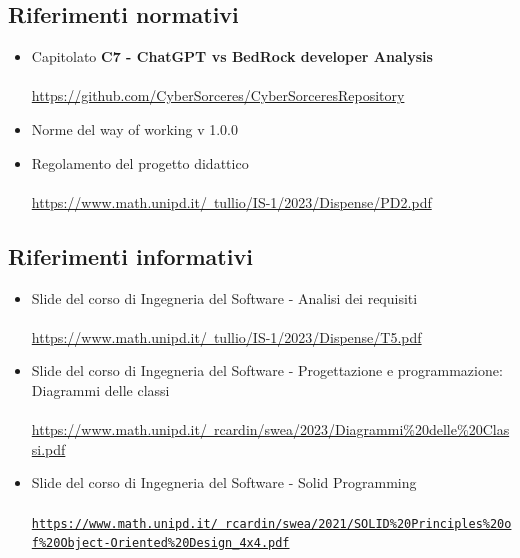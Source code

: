 \documentclass{article}
\begin{document}
{\subsection{Riferimenti normativi}
\begin{itemize}
    \item Capitolato \textbf{C7 - ChatGPT vs BedRock developer Analysis}
    \\ \\
       \href{https://github.com/CyberSorceres/CyberSorceresRepository}{https://github.com/CyberSorceres/CyberSorceresRepository} 
    \item Norme del way of working v 1.0.0
    \item Regolamento del progetto didattico \\ \\ \href{https://www.math.unipd.it/~tullio/IS-1/2023/Dispense/PD2.pdf} 
    {https://www.math.unipd.it/~tullio/IS-1/2023/Dispense/PD2.pdf}
\end{itemize}
\subsection{Riferimenti informativi}
\begin{itemize}
    \item Slide del corso di Ingegneria del Software - Analisi dei requisiti \\ \\
    \href{https://www.math.unipd.it/~tullio/IS-1/2023/Dispense/T5.pdf}{https://www.math.unipd.it/~tullio/IS-1/2023/Dispense/T5.pdf}
    \item Slide del corso di Ingegneria del Software - Progettazione e programmazione: Diagrammi delle classi \\ \\
\href{https://www.math.unipd.it/~rcardin/swea/2023/Diagrammi%20delle%20Classi.pdf}{https://www.math.unipd.it/~rcardin/swea/2023/Diagrammi\%20delle\%20Classi.pdf}
    \item Slide del corso di Ingegneria del Software - Solid Programming \\ \\
\href{https://www.math.unipd.it/~rcardin/swea/2021/SOLID\%20Principles\%20of\%20Object-Oriented\%20Design_4x4.pdf}{\texttt{https://www.math.unipd.it/~rcardin/swea/2021/SOLID\%20Principles\%20of\%20Object-Oriented\%20Design\_4x4.pdf}}
\end{itemize}
}
\end{document}
